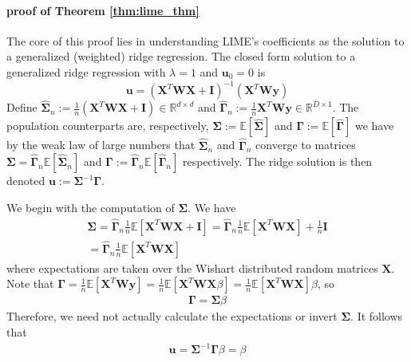 \documentclass[mnsc,blindrev]{informs3}
\begin{document}
        \paragraph{proof of Theorem \ref{thm:lime_thm}}
            The core of this proof lies in understanding LIME's coefficients as the solution to a generalized (weighted) ridge regression. The closed form solution to a generalized ridge regression with $\lambda = 1$ and $\mathbf{u}_0 = 0$ is
            \begin{equation*}
                \mathbf{u} = (\mathbf{X}^T \mathbf{W} \mathbf{X} + \mathbf{I})^{-1}(\mathbf{X}^T\mathbf{W}\mathbf{y})%
            \end{equation*}
                Define $\hat{\mathbf{\Sigma}}_n := \frac{1}{n}(\mathbf{X}^T \mathbf{W} \mathbf{X} +  \mathbf{I}) \in \mathbb{R}^{d\times d}$ and $\hat{\mathbf{\Gamma}}_n := \frac{1}{n}\mathbf{X}^T \mathbf{W}\mathbf{y}\in \mathbb{R}^{D \times 1}$. The population counterparts are, respectively, $\mathbf{\Sigma} := \mathds{E}[\hat{\mathbf{\Sigma}}]$ and $\mathbf{\mathbf{\Gamma}} := \mathds{E}[\hat{\mathbf{\Gamma}}]$ we have by the weak law of large numbers that $\hat{\mathbf{\Sigma}}_n$ and  $\hat{\mathbf{\Gamma}}_n$ converge to matrices $\mathbf{\Sigma}=\hat{\mathbf{\Gamma}}_n \mathds{E}[\hat{\mathbf{\Sigma}}_n]$ and $\mathbf{\Gamma}:=\hat{\mathbf{\Gamma}}_n \mathds{E}[\hat{\mathbf{\Gamma}}_n]$ respectively.
                The ridge solution is then denoted $\mathbf{u} := \mathbf{\Sigma}^{-1}\mathbf{\Gamma}$. 
                
                We begin with the computation of $\mathbf{\Sigma}$. We have
                \begin{gather*}
                    \mathbf{\Sigma} = \hat{\mathbf{\Gamma}}_n \frac{1}{n}\mathds{E}[\mathbf{X}^T \mathbf{W} \mathbf{X} + \mathbf{I}] 
                    = \hat{\mathbf{\Gamma}}_n \frac{1}{n}\mathds{E}[\mathbf{X}^T \mathbf{W} \mathbf{X}] + \frac{1}{n} \mathbf{I} \\
                    = \hat{\mathbf{\Gamma}}_n \frac{1}{n}\mathds{E}[\mathbf{X}^T \mathbf{W} \mathbf{X}]
                \end{gather*}
                where expectations are taken over the Wishart distributed random matrices $\mathbf{X}$.
                Note that $\mathbf{\Gamma} = \frac{1}{n}\mathds{E}[\mathbf{X}^T \mathbf{W} \mathbf{y}]=\frac{1}{n}\mathds{E}[\mathbf{X}^T \mathbf{W} \mathbf{X} \beta]=\frac{1}{n}\mathds{E}[\mathbf{X}^T \mathbf{W} \mathbf{X}] \beta$, so 
                \begin{gather*}
                    \mathbf{\Gamma} = \mathbf{\Sigma} \beta  
                \end{gather*}
        Therefore, we need not actually calculate the expectations or invert $\mathbf{\Sigma}$. It follows that
        \begin{gather*}
            \mathbf{u} = \mathbf{\Sigma}^{-1} \mathbf{\Gamma} \beta = \beta
        \end{gather*}
     
\end{document}
